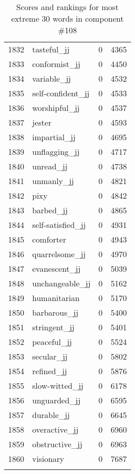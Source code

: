 \begin{longtable}[!htbp]{| rlr@{.}l |}
    1832 & tasteful\_jj & 0 & 4365 \\
    1833 & conformist\_jj & 0 & 4450 \\
    1834 & variable\_jj & 0 & 4532 \\
    1835 & self-confident\_jj & 0 & 4533 \\
    1836 & worshipful\_jj & 0 & 4537 \\
    1837 & jester & 0 & 4593 \\
    1838 & impartial\_jj & 0 & 4695 \\
    1839 & unflagging\_jj & 0 & 4717 \\
    1840 & unread\_jj & 0 & 4738 \\
    1841 & unmanly\_jj & 0 & 4821 \\
    1842 & pixy & 0 & 4842 \\
    1843 & barbed\_jj & 0 & 4865 \\
    1844 & self-satisfied\_jj & 0 & 4931 \\
    1845 & comforter & 0 & 4943 \\
    1846 & quarrelsome\_jj & 0 & 4970 \\
    1847 & evanescent\_jj & 0 & 5039 \\
    1848 & unchangeable\_jj & 0 & 5162 \\
    1849 & humanitarian & 0 & 5170 \\
    1850 & barbarous\_jj & 0 & 5400 \\
    1851 & stringent\_jj & 0 & 5401 \\
    1852 & peaceful\_jj & 0 & 5524 \\
    1853 & secular\_jj & 0 & 5802 \\
    1854 & refined\_jj & 0 & 5876 \\
    1855 & slow-witted\_jj & 0 & 6178 \\
    1856 & unguarded\_jj & 0 & 6595 \\
    1857 & durable\_jj & 0 & 6645 \\
    1858 & overactive\_jj & 0 & 6960 \\
    1859 & obstructive\_jj & 0 & 6963 \\
    1860 & visionary & 0 & 7687 \\
    \hline
    \caption{Scores and rankings for most extreme 30 words in component \#108} \\
\end{longtable}
